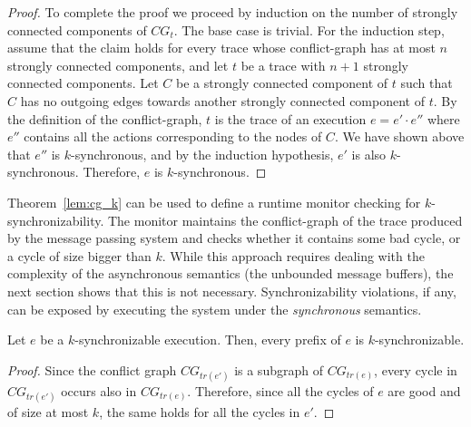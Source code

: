 \begin{proof}
To complete the proof we proceed by induction on the number of strongly connected components of $CG_t$. The base case is trivial. 
 For the induction step, assume that the claim holds for every trace whose conflict-graph has at most $n$ strongly connected components, and 
 let $t$ be a trace with $n+1$ strongly connected components.  
 Let $C$ be a strongly connected component of $t$ such that
$C$ has no outgoing edges towards another strongly connected component of $t$.
%
 By the definition of the conflict-graph, $t$ is the trace of an execution $e=e'\cdot e''$ where $e''$ contains all the actions corresponding to the nodes of $C$. 
 We have shown above that $e''$ is $k$-synchronous, and by the induction hypothesis, $e'$ is also $k$-synchronous. Therefore, $e$ is $k$-synchronous.
\end{proof}

Theorem~\ref{lem:cg_k} can be used to define a runtime monitor checking for $k$-synchronizability. 
The monitor maintains the conflict-graph of the trace produced by the message passing system and checks whether it contains some bad cycle, or a cycle of size bigger than $k$.
While this approach requires dealing with the complexity of the asynchronous semantics (the unbounded message buffers), the next section shows that this is not necessary. Synchronizability violations, if any, can be exposed by executing the system under the \emph{synchronous} semantics.

\begin{lemma}\label{lem:pref_closed}
Let $e$ be a $k$-synchronizable execution. Then, every prefix of $e$ is $k$-synchronizable. 
\end{lemma}
\begin{proof}
Since the conflict graph $CG_{tr(e')}$ is a subgraph of $CG_{tr(e)}$, every cycle in $CG_{tr(e')}$ occurs also in $CG_{tr(e)}$. Therefore, since all the cycles of $e$ are good and of size at most $k$, the same holds for all the cycles in $e'$.
\end{proof}


